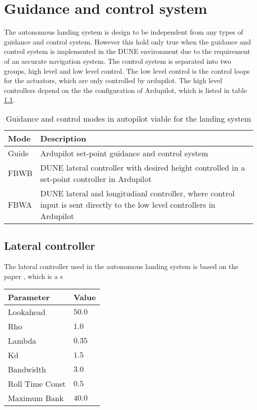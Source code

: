 \chapter{Guidance and control system}\label{AP:ControlGuidanceSystem}
The autonomous landing system is design to be independent from any types of guidance and control system. However this hold only true when the guidance and control system is implemented in the DUNE environment due to the requirement of an accurate navigation system. The control system is separated into two groups, high level and low level control. The low level control is the control loops for the actuators, which are only controlled by ardupilot. The high level controllers depend on the the configuration of Ardupilot, which is listed in table \ref{tb:ArduPilotMode}.
\begin{table}
\centering
\begin{tabular}{| p{3cm} | p{5cm}|}
\hline
\textbf{Mode}	&	\textbf{Description} \\ \hline
Guide			& Ardupilot set-point guidance and control system 												\\ \hline
FBWB			& DUNE lateral controller with desired height controlled in a set-point controller in Ardupilot \\ \hline
FBWA			& DUNE lateral and longitudianl controller, where control input is sent directly to the low level controllers in Ardupilot 																						\\ \hline
\end{tabular}
\caption{Guidance and control modes in autopilot viable for the landing system}
\label{tb:ArduPilotMode}
\end{table}

\section{Lateral controller}
The lateral controller used in the autonomous landing system is based on the paper \citep{fortuna2015cascaded}, which is a s

\begin{table}
\centering
\begin{tabular}{| l | l |}
\hline
\textbf{Parameter}	&	\textbf{Value} \\ \hline
Lookahead           &                    $50.0$ \\ \hline
Rho                 &                    $1.0$ \\ \hline
Lambda				&                    $0.35$ \\ \hline
Kd					&                    $1.5$ \\ \hline
Bandwidth			&                    $3.0$ \\ \hline
Roll Time Const		&                    $0.5$ \\ \hline
Maximum Bank		&                    $40.0$ \\ \hline

\end{tabular}
\end{table}
